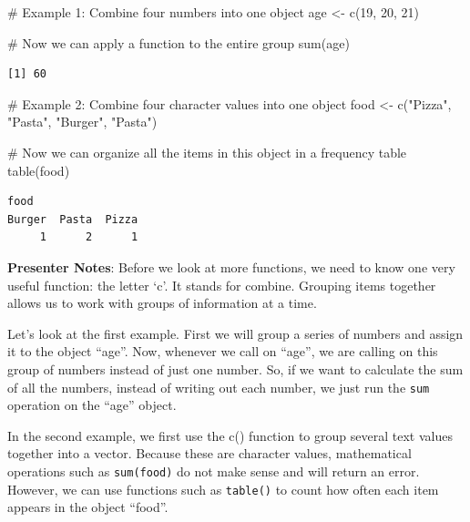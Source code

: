 \documentclass[
  letterpaper,
  DIV=11,
  numbers=noendperiod]{scrartcl}
\newenvironment{Shaded}{\begin{snugshade}}{\end{snugshade}}
\newcommand{\CommentTok}[1]{\textcolor[rgb]{0.37,0.37,0.37}{#1}}
\newcommand{\DecValTok}[1]{\textcolor[rgb]{0.68,0.00,0.00}{#1}}
\newcommand{\FunctionTok}[1]{\textcolor[rgb]{0.28,0.35,0.67}{#1}}
\newcommand{\NormalTok}[1]{\textcolor[rgb]{0.00,0.23,0.31}{#1}}
\newcommand{\OtherTok}[1]{\textcolor[rgb]{0.00,0.23,0.31}{#1}}
\newcommand{\StringTok}[1]{\textcolor[rgb]{0.13,0.47,0.30}{#1}}
\begin{document}
\begin{Shaded}
\begin{Highlighting}[]
\CommentTok{\# Example 1: Combine four numbers into one object}
\NormalTok{age }\OtherTok{\textless{}{-}} \FunctionTok{c}\NormalTok{(}\DecValTok{19}\NormalTok{, }\DecValTok{20}\NormalTok{, }\DecValTok{21}\NormalTok{)}

\CommentTok{\# Now we can apply a function to the entire group}
\FunctionTok{sum}\NormalTok{(age)}
\end{Highlighting}
\end{Shaded}

\begin{verbatim}
[1] 60
\end{verbatim}

\begin{Shaded}
\begin{Highlighting}[]
\CommentTok{\# Example 2: Combine four character values into one object}
\NormalTok{food }\OtherTok{\textless{}{-}} \FunctionTok{c}\NormalTok{(}\StringTok{"Pizza"}\NormalTok{, }\StringTok{"Pasta"}\NormalTok{, }\StringTok{"Burger"}\NormalTok{, }\StringTok{"Pasta"}\NormalTok{)}

\CommentTok{\# Now we can organize all the items in this object in a frequency table}
\FunctionTok{table}\NormalTok{(food)}
\end{Highlighting}
\end{Shaded}

\begin{verbatim}
food
Burger  Pasta  Pizza 
     1      2      1 
\end{verbatim}

\textbf{Presenter Notes}: Before we look at more functions, we need to
know one very useful function: the letter `c'. It stands for combine.
Grouping items together allows us to work with groups of information at
a time.

Let's look at the first example. First we will group a series of numbers
and assign it to the object ``age''. Now, whenever we call on ``age'',
we are calling on this group of numbers instead of just one number. So,
if we want to calculate the sum of all the numbers, instead of writing
out each number, we just run the \texttt{sum} operation on the ``age''
object.

In the second example, we first use the c() function to group several
text values together into a vector. Because these are character values,
mathematical operations such as \texttt{sum(food)} do not make sense and
will return an error. However, we can use functions such as
\texttt{table()} to count how often each item appears in the object
``food''.
\end{document}
